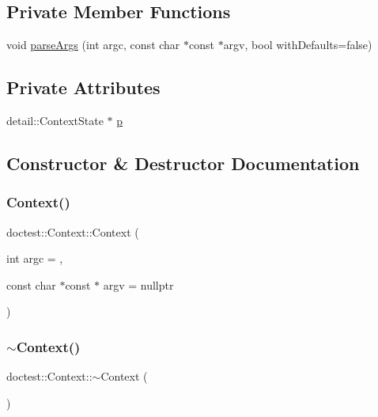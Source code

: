 \subsection*{Private Member Functions}
\begin{DoxyCompactItemize}
\item 
void \hyperlink{classdoctest_1_1Context_a90b2f1bbf67ee4da8e8ff0cf7516a06a}{parse\+Args} (int argc, const char $\ast$const $\ast$argv, bool with\+Defaults=false)
\end{DoxyCompactItemize}
\subsection*{Private Attributes}
\begin{DoxyCompactItemize}
\item 
detail\+::\+Context\+State $\ast$ \hyperlink{classdoctest_1_1Context_a1e22f778caf173478623e22546d7b493}{p}
\end{DoxyCompactItemize}


\subsection{Constructor \& Destructor Documentation}
\mbox{\label{classdoctest_1_1Context_a881bc2d0fe207d672e1debe830768a98}} 
\subsubsection{\texorpdfstring{Context()}{Context()}}
{\footnotesize\ttfamily doctest\+::\+Context\+::\+Context (\begin{DoxyParamCaption}\item[{int}]{argc = {},  }\item[{const char $\ast$const $\ast$}]{argv = {\ttfamily nullptr} }\end{DoxyParamCaption})\hspace{0.3cm}{\ttfamily [explicit]}}

\mbox{\label{classdoctest_1_1Context_a33b344fbc4803dca81147c4a4cc9edbd}} 
\subsubsection{\texorpdfstring{$\sim$\+Context()}{~Context()}}
{\footnotesize\ttfamily doctest\+::\+Context\+::$\sim$\+Context (\begin{DoxyParamCaption}{ }\end{DoxyParamCaption})}



